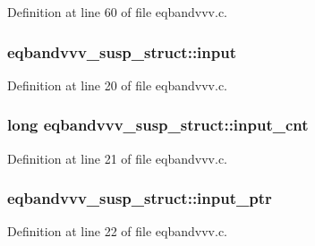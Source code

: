 Definition at line 60 of file eqbandvvv.\+c.

\subsubsection[{\texorpdfstring{input}{input}}]{ eqbandvvv\+\_\+susp\+\_\+struct\+::input}\hypertarget{structeqbandvvv__susp__struct_aca61cf255798f7a788d3e478eeb389a6}{}\label{structeqbandvvv__susp__struct_aca61cf255798f7a788d3e478eeb389a6}


Definition at line 20 of file eqbandvvv.\+c.

\subsubsection[{\texorpdfstring{input\+\_\+cnt}{input_cnt}}]{\setlength{\rightskip}{0pt plus 5cm}long eqbandvvv\+\_\+susp\+\_\+struct\+::input\+\_\+cnt}\hypertarget{structeqbandvvv__susp__struct_a0d67949691ceed8233014cb15f896aff}{}\label{structeqbandvvv__susp__struct_a0d67949691ceed8233014cb15f896aff}


Definition at line 21 of file eqbandvvv.\+c.

\subsubsection[{\texorpdfstring{input\+\_\+ptr}{input_ptr}}]{ eqbandvvv\+\_\+susp\+\_\+struct\+::input\+\_\+ptr}\hypertarget{structeqbandvvv__susp__struct_a9a55cbabae2cb4eef073ba118cb5be20}{}\label{structeqbandvvv__susp__struct_a9a55cbabae2cb4eef073ba118cb5be20}


Definition at line 22 of file eqbandvvv.\+c.

